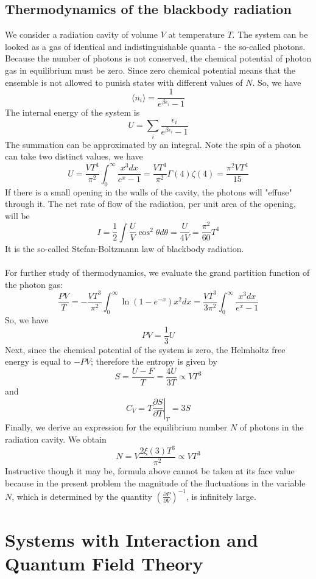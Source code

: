 \documentclass[cyan]{elegantnote}
\begin{document}
\section{Thermodynamics of the blackbody radiation}
We consider a radiation cavity of volume $V$ at temperature $T$. The system can be looked as a gas of identical and indistinguishable quanta - the so-called photons. 
Because the number of photons is not conserved, the chemical potential of photon gas in equilibrium must be zero. Since zero chemical potential means that the ensemble is not allowed to punish states with different values of $N$. 
So, we have
\[\langle n_i \rangle = \frac{1}{e^{\beta \epsilon_i} - 1}\]
The internal energy of the system is
\[ U = \sum_i \frac{\epsilon_i}{e^{\beta \epsilon_i} - 1}\]
The summation can be approximated by an integral. Note the spin of a photon can take two distinct values, we have
\[U = \frac{VT^4}{\pi^2} \int_0^{\infty} \frac{x^3dx}{e^x - 1} = \frac{VT^4}{\pi^2} \Gamma(4)\zeta(4) = \frac{\pi^2VT^4}{15}\]
If there is a small opening in the walls of the cavity, the photons will "effuse" through it. The net rate of flow of the radiation, per unit area of the opening, will be
\[I = \frac{1}{2} \int \frac{U}{V} \cos^2\theta d\theta = \frac{U}{4V} = \frac{\pi^2}{60}T^4\]
It is the so-called Stefan-Boltzmann law of blackbody radiation.
\\ \\
For further study of thermodynamics, we evaluate the grand partition function of the photon gas:
\[\frac{PV}{T} = -\frac{VT^3}{\pi^2} \int_0^{\infty} \ln(1-e^{-x}) x^2 dx = \frac{VT^3}{3\pi^2} \int_0^{\infty} \frac{x^3dx}{e^x - 1}\]
So, we have 
\[PV = \frac{1}{3}U\]
Next, since the chemical potential of the system is zero, the Helmholtz free energy is equal to $-PV$; therefore the entropy is given by
\[S = \frac{U-F}{T} = \frac{4U}{3T} \propto VT^3\]
and
\[C_V = T \left. \frac{\partial S}{\partial T} \right|_T = 3S\]
Finally, we derive an expression for the equilibrium number $N$ of photons in the radiation cavity. We obtain
\[N = V\frac{2\xi(3)T^3}{\pi^2} \propto VT^3\]
Instructive though it may be, formula above cannot be taken at its face value because in the present problem the magnitude of the fluctuations in the variable $N$, which is determined by the quantity $\left(\frac{\partial P}{\partial V} \right)^{-1}$, is infinitely large.

\chapter{Systems with Interaction and Quantum Field Theory}
\end{document}
